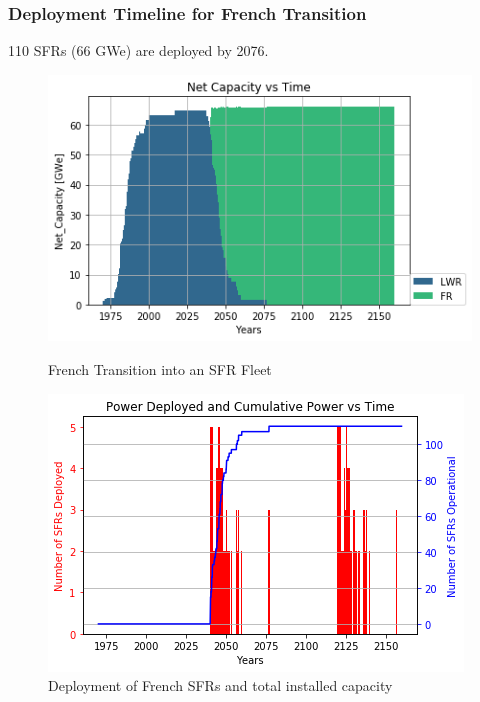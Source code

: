 \begin{frame}
	\frametitle{Deployment Timeline for French Transition}
	110 \glspl{SFR} (66 GWe) are deployed by 2076.
	\begin{figure}[htbp!]
	\begin{minipage}[b]{.45\linewidth}
        \begin{center}
                \includegraphics[width=\textwidth]{./images/french-transition/power_plot.png}
        \end{center}
        \caption{French Transition into an SFR Fleet}
        \label{fig:sfr_num}
	\end{minipage}
	\hspace{.5cm}
	\begin{minipage}[b]{.45\linewidth}
		\centering
		\includegraphics[width=\textwidth]{./images/french-transition/sfr_deploy.png}
		\caption{Deployment of French \glspl{SFR} and total installed capacity}
		\label{fig:dep}
	\end{minipage}
\end{figure}
\end{frame}